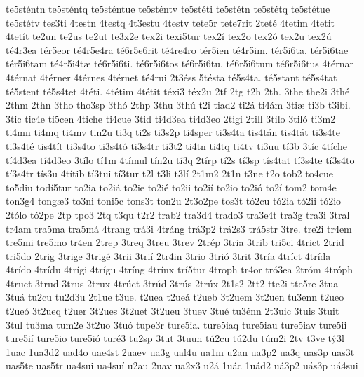 {te5st^^e9ntn
te5st^^e9ntq
te5st^^e9ntue
te5st^^e9ntv
te5st^^e9ti
te5st^^e9tn
te5st^^e9tq
te5st^^e9tue
te5st^^e9tv
tes3ti
4testn
4testq
4t3estu
4testv
tete5r
tete7rit
2tet^^e9
4tetim
4tetit
4tet^^edt
te2un
te2us
te2ut
te3x2e
tex2i
texi5tur
tex2^^ed
tex2o
tex2^^f3
tex2u
tex2^^fa
t^^e94r3ea
t^^e9r5eor
t^^e94r5e4ra
t^^e96r5e6rit
t^^e94re4ro
t^^e9r5ien
t^^e94r5im.
t^^e9r5i6ta.
t^^e9r5i6tae
t^^e9r5i6tam
t^^e94r5i4t^^e6
t^^e96r5i6ti.
t^^e96r5i6tos
t^^e96r5i6tu.
t^^e96r5i6tum
t^^e96r5i6tus
4t^^e9rnar
4t^^e9rnat
4t^^e9rner
4t^^e9rnes
4t^^e9rnet
t^^e94rui
2t3^^e9ss
5t^^e9sta
t^^e95s4ta.
t^^e95stant
t^^e95s4tat
t^^e95stent
t^^e95s4tet
4t^^e9ti.
4t^^e9tim
4t^^e9tit
t^^e9xi3
t^^e9x2u
2tf
2tg
t2h
2th.
3the
the2i
3th^^e9
2thm
2thn
3tho
tho3sp
3th^^f3
2thp
3thu
3th^^fa
t2i
tiad2
ti2^^e1
ti4^^e1m
3ti^^e6
ti3b
t3ibi.
3tic
tic4e
ti5cen
4tiche
ti4cue
3tid
ti4d3ea
ti4d3eo
2tigi
2till
3tilo
3til^^f3
ti3m2
ti4mn
ti4mq
ti4mv
tin2u
ti3q
ti2s
ti3s2p
ti4sper
ti3s4ta
tis4t^^e1n
tis4t^^e1t
ti3s4te
ti3s4t^^e9
tis4t^^edt
ti3s4to
ti3s4t^^f3
ti3s4tr
ti3t2
ti4tn
ti4tq
ti4tv
ti3uu
t^^ed3b
3t^^edc
4t^^edche
t^^ed4d3ea
t^^ed4d3eo
3t^^edlo
t^^ed1m
4t^^edmul
t^^edn2u
t^^ed3q
2t^^edrp
t^^ed2s
t^^ed3sp
t^^eds4tat
t^^ed3s4te
t^^ed3s4to
t^^ed3s4tr
t^^eds3u
4t^^edtib
t^^ed3tui
t^^ed3tur
t2l
t3li
t3l^^ed
2t1m2
2t1n
t3ne
t2o
tob2
to4cue
to5diu
tod^^ed5tur
to2ia
to2i^^e1
to2ie
to2i^^e9
to2ii
to2i^^ed
to2io
to2i^^f3
to2^^ed
tom2
tom4e
ton3g4
tong^^e63
to3ni
toni5c
tons3t
ton2u
2t3o2pe
tos3t
t^^f32cu
t^^f32ia
t^^f32ii
t^^f32io
2t^^f3lo
t^^f32pe
2tp
tpo3
2tq
t3qu
t2r2
trab2
tra3d4
trado3
tra3e4t
tra3g
tra3i
3tral
tr4am
tra5ma
tra5m^^e1
4trang
tr^^e13i
4tr^^e1ng
tr^^e13p2
tr^^e12s3
tr^^e15str
3tre.
tre2i
tr4em
tre5mi
tre5mo
tr4en
2trep
3treq
3treu
3trev
2tr^^e9p
3tria
3trib
tri5ci
4trict
2trid
tri5do
2trig
3trige
3trig^^e9
3trii
3tri^^ed
2tr4in
3trio
3tri^^f3
3trit
3tr^^eda
4tr^^edct
4tr^^edda
4tr^^eddo
4tr^^eddu
4tr^^edgi
4tr^^edgu
4tr^^edng
4tr^^ednx
tr^^ed5tur
4troph
tr4or
tr^^f33ea
2tr^^f3m
4tr^^f3ph
4truct
3trud
3trus
2trux
4tr^^fact
3tr^^fad
3tr^^fas
2tr^^fax
2t1s2
2tt2
tte2i
tte5re
3tua
3tu^^e1
tu2cu
tu2d3u
2t1ue
t3ue.
t2uea
t2ue^^e1
t2ueb
3t2uem
3t2uen
tu3enn
t2ueo
t2ue^^f3
3t2ueq
t2uer
3t2ues
3t2uet
3t2ueu
3tuev
3tu^^e9
tu3^^e9nn
2t3uic
3tuis
3tuit
3tul
tu3ma
tum2e
3t2uo
3tu^^f3
tupe3r
ture5ia.
ture5iaq
ture5iau
ture5iav
ture5ii
ture5i^^ed
ture5io
ture5i^^f3
tur^^e93
tu2sp
3tut
3tuun
t^^fa2cu
t^^fa2du
t^^fam2i
2tv
t3ve
t^^fd3l
1uac
1ua3d2
uad4o
uae4st
2uaev
ua3g
ual4u
ua1m
u2an
ua3p2
ua3q
uas3p
uas3t
uas5te
uas5tr
ua4sui
ua4su^^ed
u2au
2uav
ua2x3
u2^^e1
1u^^e1c
1u^^e1d2
u^^e13p2
u^^e1s3p
u^^e14sui
}
